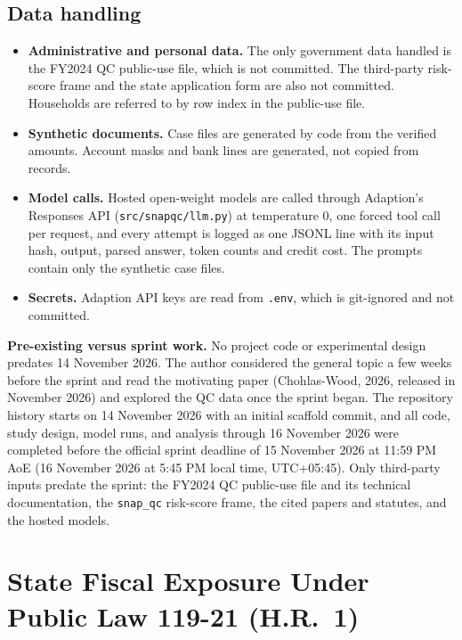 \documentclass[sigconf,nonacm,screen]{acmart}
\begin{document}
\subsection{Data handling}

\begin{itemize}
  \item \textbf{Administrative and personal data.} The only government data handled is the FY2024 QC public-use file, which is not committed. The third-party risk-score frame and the state application form are also not committed. Households are referred to by row index in the public-use file.
  \item \textbf{Synthetic documents.} Case files are generated by code from the verified amounts. Account masks and bank lines are generated, not copied from records.
  \item \textbf{Model calls.} Hosted open-weight models are called through Adaption's Responses API (\texttt{src/snapqc/llm.py}) at temperature 0, one forced tool call per request, and every attempt is logged as one JSONL line with its input hash, output, parsed answer, token counts and credit cost. The prompts contain only the synthetic case files.
  \item \textbf{Secrets.} Adaption API keys are read from \texttt{.env}, which is git-ignored and not committed.
\end{itemize}

\textbf{Pre-existing versus sprint work.} No project code or experimental design predates 14 November 2026. The author considered the general topic a few weeks before the sprint and read the motivating paper (Chohlas-Wood, 2026, released in November 2026) and explored the QC data once the sprint began. The repository history starts on 14 November 2026 with an initial scaffold commit, and all code, study design, model runs, and analysis through 16 November 2026 were completed before the official sprint deadline of 15 November 2026 at 11:59 PM AoE (16 November 2026 at 5:45 PM local time, UTC+05:45). Only third-party inputs predate the sprint: the FY2024 QC public-use file and its technical documentation, the \texttt{snap\_qc} risk-score frame, the cited papers and statutes, and the hosted models.

\section{State Fiscal Exposure Under Public Law 119-21 (H.R.\ 1)}
\label{app:hr1-stakes}
\end{document}
